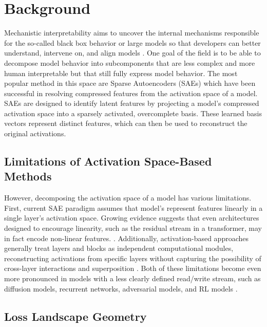 \documentclass{article}
\theoremstyle{plain}
\theoremstyle{definition}
\theoremstyle{remark}
\begin{document}
\section{Background}


Mechanistic interpretability aims to uncover the internal mechanisms responsible for the so-called black box behavior or large models so that developers can better understand, intervene on, and align models \cite{bereska2024mechanistic}. One goal of the field is to be able to decompose model behavior into subcomponents that are less complex and more human interpretable but that still fully express model behavior. The most popular method in this space are Sparse Autoencoders (SAEs) \cite{gao2024scaling,cunningham2023sparse,bricken2023towards} which have been successful in resolving compressed features from the activation space of a model. SAEs are designed to identify latent features by projecting a model's compressed activation space into a sparsely activated, overcomplete basis. These learned basis vectors represent distinct features, which can then be used to reconstruct the original activations.


\subsection{Limitations of Activation Space-Based Methods}

However, decomposing the activation space of a model has various limitations.  First, current SAE paradigm assumes that model's represent features linearly in a single layer's activation space. Growing evidence suggests that even architectures designed to encourage linearity, such as the residual stream in a transformer, may in fact encode non-linear features. \cite{engels2024not,engels2024decomposing}. Additionally, activation-based approaches generally treat layers and blocks as independent computational modules, reconstructing activations from specific layers without capturing the possibility of cross-layer interactions and superposition \cite{merullo2024talking,lindsey2024sparse}. Both of these limitations become even more pronounced in models with a less clearly defined read/write stream, such as diffusion models, recurrent networks, adversarial models, and RL models \cite{pascanu2013difficulty,goodfellow2014generative,ho2020denoising,mnih2015human}. 

\subsection{Loss Landscape Geometry}
\end{document}
